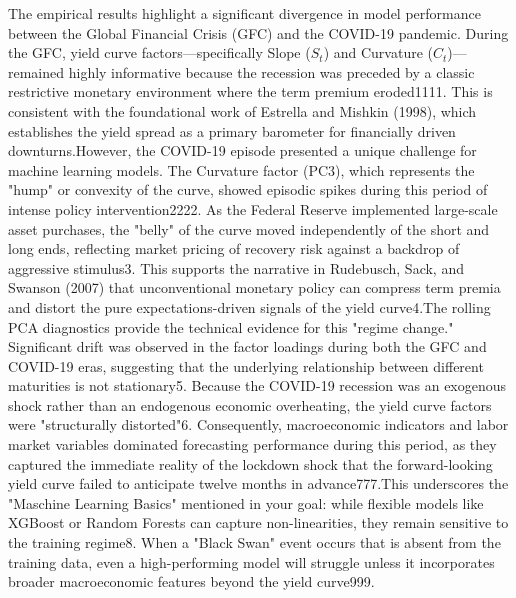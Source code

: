 The empirical results highlight a significant divergence in model performance between the Global Financial Crisis (GFC) and the COVID-19 pandemic. During the GFC, yield curve factors—specifically Slope ($S_t$) and Curvature ($C_t$)—remained highly informative because the recession was preceded by a classic restrictive monetary environment where the term premium eroded1111. This is consistent with the foundational work of Estrella and Mishkin (1998), which establishes the yield spread as a primary barometer for financially driven downturns.However, the COVID-19 episode presented a unique challenge for machine learning models. The Curvature factor (PC3), which represents the "hump" or convexity of the curve, showed episodic spikes during this period of intense policy intervention2222. As the Federal Reserve implemented large-scale asset purchases, the "belly" of the curve moved independently of the short and long ends, reflecting market pricing of recovery risk against a backdrop of aggressive stimulus3. This supports the narrative in Rudebusch, Sack, and Swanson (2007) that unconventional monetary policy can compress term premia and distort the pure expectations-driven signals of the yield curve4.The rolling PCA diagnostics provide the technical evidence for this "regime change." Significant drift was observed in the factor loadings during both the GFC and COVID-19 eras, suggesting that the underlying relationship between different maturities is not stationary5. Because the COVID-19 recession was an exogenous shock rather than an endogenous economic overheating, the yield curve factors were "structurally distorted"6. Consequently, macroeconomic indicators and labor market variables dominated forecasting performance during this period, as they captured the immediate reality of the lockdown shock that the forward-looking yield curve failed to anticipate twelve months in advance777.This underscores the "Maschine Learning Basics" mentioned in your goal: while flexible models like XGBoost or Random Forests can capture non-linearities, they remain sensitive to the training regime8. When a "Black Swan" event occurs that is absent from the training data, even a high-performing model will struggle unless it incorporates broader macroeconomic features beyond the yield curve999.